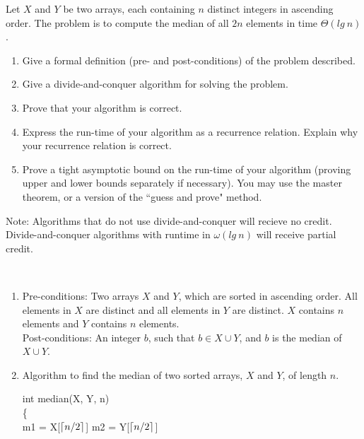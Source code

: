 \documentclass{assignment}
\DeclarePairedDelimiter\ceil{\lceil}{\rceil}
\begin{document}
\begin{problemlist}
\clearpage
\pbitem
\begin{problem}
Let $X$ and $Y$ be two arrays, each containing $n$ distinct integers in ascending order. The problem is to compute the median of all $2n$ elements in time $\Theta(lg~n)$.
\begin{enumerate}
\item Give a formal definition (pre- and post-conditions) of the problem described.
\item Give a divide-and-conquer algorithm for solving the problem.
\item Prove that your algorithm is correct.
\item Express the run-time of your algorithm as a recurrence relation. Explain why your recurrence relation is correct.
\item Prove a tight asymptotic bound on the run-time of your algorithm (proving upper and lower bounds separately if necessary). You may use the master theorem, or a version of the ``guess and prove" method.
\end{enumerate}
Note: Algorithms that do not use divide-and-conquer will recieve no credit. Divide-and-conquer algorithms with runtime in $\omega(lg~n)$ will receive partial credit.
\end{problem}
\begin{answer}
\\
\begin{enumerate}
\item
Pre-conditions: Two arrays $X$ and $Y$, which are sorted in ascending order. All elements in $X$ are distinct and all elements in $Y$ are distinct. $X$ contains $n$ elements and $Y$ contains $n$ elements.\\
Post-conditions: An integer $b$, such that $b \in X \cup Y$, and $b$ is the median of $X \cup Y$.\\
\item
Algorithm to find the median of two sorted arrays, $X$ and $Y$, of length $n$.\\
\IncMargin{3em}
\begin{algorithm}
  int median(X, Y, n)\\\{\\
  \Indp
  m1 = X[$\ceil{n/2}$]\;
  m2 = Y[$\ceil{n/2}$]\;
\end{algorithm}
\end{enumerate}
\end{answer}
\end{problemlist}
\end{document}
